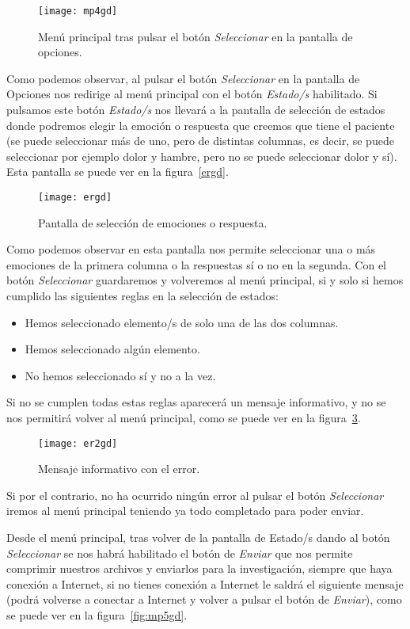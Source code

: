 \begin{figure}[H]
	\centering
	\texttt{[image: mp4gd]}
	\caption{Menú principal tras pulsar el botón \textit{Seleccionar} en la pantalla de opciones.}
	\label{fig:mp4gd}
\end{figure}

Como podemos observar, al pulsar el botón \textit{Seleccionar} en la pantalla de Opciones nos redirige al menú principal con el botón \textit{Estado/s} habilitado. Si pulsamos este botón \textit{Estado/s} nos llevará a la pantalla de selección de estados donde podremos elegir la emoción o respuesta que creemos que tiene el paciente (se puede seleccionar más de uno, pero de distintas columnas, es decir, se puede seleccionar por ejemplo dolor y hambre, pero no se puede seleccionar dolor y sí). Esta pantalla se puede ver en la figura~\ref{ergd}.

\begin{figure}[H]
	\centering
	\texttt{[image: ergd]}
	\caption{Pantalla de selección de emociones o respuesta.}
	\label{fig:ergd}
\end{figure}

Como podemos observar en esta pantalla nos permite seleccionar una o más emociones de la primera columna o la respuestas sí o no en la segunda. Con el botón \textit{Seleccionar} guardaremos y volveremos al menú principal, si y solo si hemos cumplido las siguientes reglas en la selección de estados:
\begin{itemize}
	\item Hemos seleccionado elemento/s de solo una de las dos columnas.
	\item Hemos seleccionado algún elemento.
	\item No hemos seleccionado sí y no a la vez.
\end{itemize}

Si no se cumplen todas estas reglas aparecerá un mensaje informativo, y no se nos permitirá volver al menú principal, como se puede ver en la figura~\ref{fig:er2gd}.
\begin{figure}[H]
	\centering
	\texttt{[image: er2gd]}
	\caption{Mensaje informativo con el error.}
	\label{fig:er2gd}
\end{figure}
Si por el contrario, no ha ocurrido ningún error al pulsar el botón \textit{Seleccionar} iremos al menú principal teniendo ya todo completado para poder enviar.

Desde el menú principal, tras volver de la pantalla de Estado/s dando al botón \textit{Seleccionar} se nos habrá habilitado el botón de \textit{Enviar} que nos permite comprimir nuestros archivos y enviarlos para la investigación, siempre que haya conexión a Internet, si no tienes conexión a Internet le saldrá el siguiente mensaje (podrá volverse a conectar a Internet y volver a pulsar el botón de \textit{Enviar}), como se puede ver en la figura~\ref{fig:mp5gd}.

